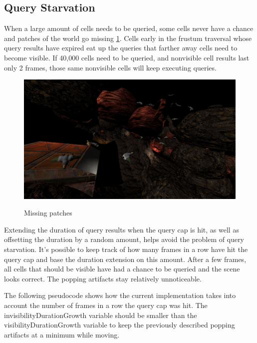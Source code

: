\documentclass[12pt]{ucthesis}
\newcommand{\captionfonts}{\small\bf\ssp}
\begin{document}
\subsection {Query Starvation}
\label{query-starvation}

When a large amount of cells needs to be queried, some cells never have a chance and patches of the world go missing \ref{fig:missing-patches}.
Cells early in the frustum traversal whose query results have expired eat up the queries that farther away cells need to become visible.
If 40,000 cells need to be queried, and nonvisible cell results last only 2 frames, those same nonvisible cells will keep executing queries.

\begin{figure}
\begin{center}
\includegraphics[width=\textwidth]{Images/MissingPatches.jpg}
\captionfonts
\caption[Missing patches]{Missing patches}
\label{fig:missing-patches}
\end{center}
\end{figure}

Extending the duration of query results when the query cap is hit, as well as offsetting the duration by a random amount, helps avoid the problem of query starvation.
It's possible to keep track of how many frames in a row have hit the query cap and base the duration extension on this amount.
After a few frames, all cells that should be visible have had a chance to be queried and the scene looks correct.
The popping artifacts stay relatively unnoticeable.

The following pseudocode shows how the current implementation takes into account the number of frames in a row the query cap was hit.  The invisibilityDurationGrowth variable should be smaller than the visibilityDurationGrowth variable to keep the previously described popping artifacts at a minimum while moving.
\end{document}
